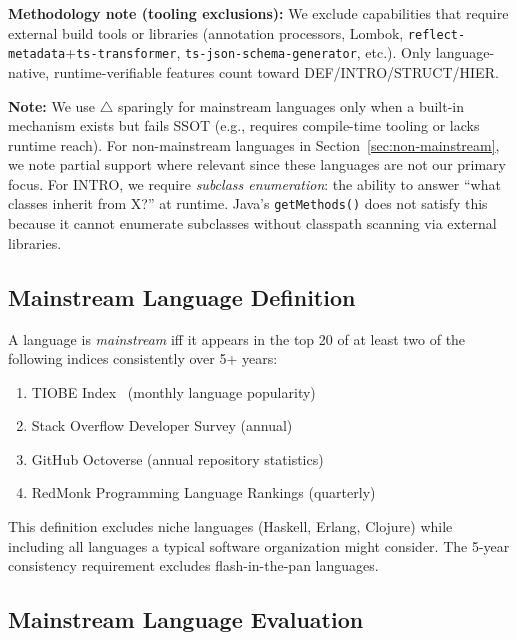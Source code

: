 \textbf{Methodology note (tooling exclusions):} We exclude capabilities
that require external build tools or libraries (annotation processors,
Lombok, \texttt{reflect-metadata}+\texttt{ts-transformer},
\texttt{ts-json-schema-generator}, etc.). Only language-native,
runtime-verifiable features count toward DEF/INTRO/STRUCT/HIER.

\textbf{Note:} We use $\triangle$ sparingly for mainstream languages
only when a built-in mechanism exists but fails SSOT (e.g., requires
compile-time tooling or lacks runtime reach). For non-mainstream
languages in Section~\ref{sec:non-mainstream}, we note partial support
where relevant since these languages are not our primary focus. For
INTRO, we require \emph{subclass enumeration}: the ability to answer
``what classes inherit from X?'' at runtime. Java's
\texttt{getMethods()} does not satisfy this because it cannot enumerate
subclasses without classpath scanning via external libraries.

\subsection{Mainstream Language Definition}\label{sec:mainstream-def}

\begin{definition}\label{def:mainstream}
A language is \emph{mainstream} iff it appears in the top 20 of at least two of the following indices consistently over 5+ years:
\begin{enumerate}
\tightlist
\item TIOBE Index~\cite{tiobe2024} (monthly language popularity)
\item Stack Overflow Developer Survey (annual)
\item GitHub Octoverse (annual repository statistics)
\item RedMonk Programming Language Rankings (quarterly)
\end{enumerate}
\end{definition}

This definition excludes niche languages (Haskell, Erlang, Clojure) while including all languages a typical software organization might consider. The 5-year consistency requirement excludes flash-in-the-pan languages.

\subsection{Mainstream Language Evaluation}\label{sec:mainstream-eval}

